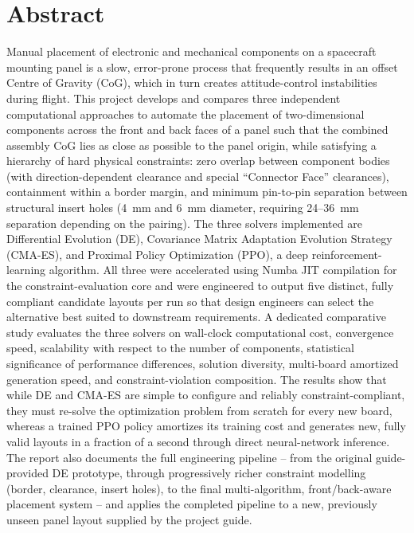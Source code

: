 \documentclass[11pt,a4paper,oneside]{report}
\begin{document}
\chapter*{Abstract}
Manual placement of electronic and mechanical components on a spacecraft mounting panel is a slow, error-prone process that frequently results in an offset Centre of Gravity (CoG), which in turn creates attitude-control instabilities during flight. This project develops and compares three independent computational approaches to automate the placement of two-dimensional components across the front and back faces of a panel such that the combined assembly CoG lies as close as possible to the panel origin, while satisfying a hierarchy of hard physical constraints: zero overlap between component bodies (with direction-dependent clearance and special ``Connector Face'' clearances), containment within a border margin, and minimum pin-to-pin separation between structural insert holes (4~mm and 6~mm diameter, requiring 24--36~mm separation depending on the pairing). The three solvers implemented are Differential Evolution (DE), Covariance Matrix Adaptation Evolution Strategy (CMA-ES), and Proximal Policy Optimization (PPO), a deep reinforcement-learning algorithm. All three were accelerated using Numba JIT compilation for the constraint-evaluation core and were engineered to output five distinct, fully compliant candidate layouts per run so that design engineers can select the alternative best suited to downstream requirements. A dedicated comparative study evaluates the three solvers on wall-clock computational cost, convergence speed, scalability with respect to the number of components, statistical significance of performance differences, solution diversity, multi-board amortized generation speed, and constraint-violation composition. The results show that while DE and CMA-ES are simple to configure and reliably constraint-compliant, they must re-solve the optimization problem from scratch for every new board, whereas a trained PPO policy amortizes its training cost and generates new, fully valid layouts in a fraction of a second through direct neural-network inference. The report also documents the full engineering pipeline -- from the original guide-provided DE prototype, through progressively richer constraint modelling (border, clearance, insert holes), to the final multi-algorithm, front/back-aware placement system -- and applies the completed pipeline to a new, previously unseen panel layout supplied by the project guide.
\newpage
\tableofcontents
\listoffigures
\listoftables
\end{document}
